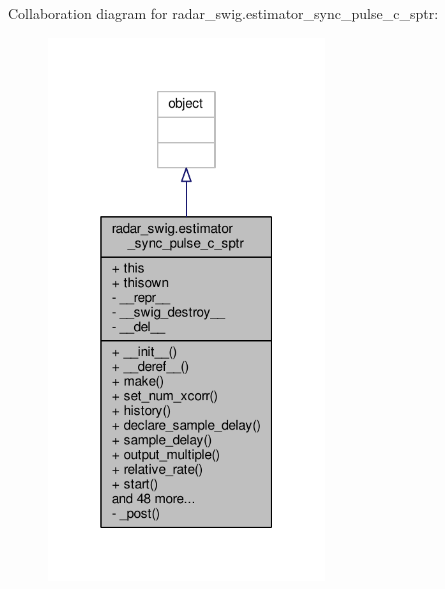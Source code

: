 Collaboration diagram for radar\+\_\+swig.\+estimator\+\_\+sync\+\_\+pulse\+\_\+c\+\_\+sptr\+:
\nopagebreak
\begin{figure}[H]
\begin{center}
\leavevmode
\includegraphics[width=208pt]{d8/d25/classradar__swig_1_1estimator__sync__pulse__c__sptr__coll__graph}
\end{center}
\end{figure}
